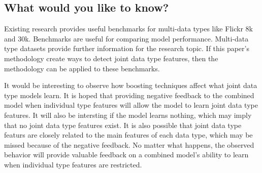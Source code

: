 \subsection{What would you like to know?}

Existing research provides useful benchmarks for multi-data types like Flickr 8k and 30k.  Benchmarks are useful for comparing model performance.  Multi-data type datasets provide further information for the research topic.  If this paper's methodology create ways to detect joint data type features, then the methodology can be applied to these benchmarks.

It would be interesting to observe how boosting techniques affect what joint data type models learn.  It is hoped that providing negative feedback to the combined model when individual type features will allow the model to learn joint data type features. It will also be intersting if the model learns nothing, which may imply that no joint data type features exist.  It is also possible that joint data type featurs are closely related to the main features of each data type, which may be missed because of the negative feedback.  No matter what happens, the observed behavior will provide valuable feedback on a combined model's ability to learn when individual type features are restricted.
